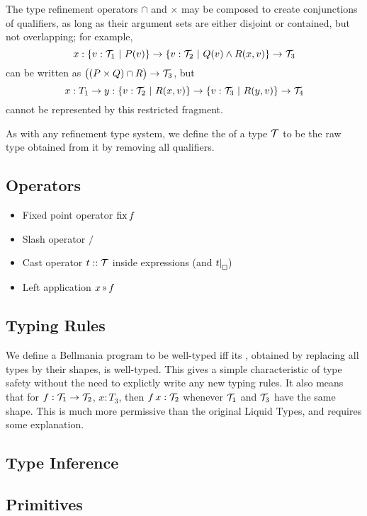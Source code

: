 The type refinement operators $\cap$ and $\times$ may be composed to create conjunctions of qualifiers,
as long as their argument sets are either disjoint or contained, but not overlapping;
for example, \[x:\{v:\mathcal{T}_1~|~P(v)\}\to \{v:\mathcal{T}_2~|~Q(v)\land R(x,v)\}\to\mathcal{T}_3\] can be written as
$\big((P\times Q)\cap R\big)\to\mathcal{T}_3$, but \[x:T_1\to y:\{v:\mathcal{T}_2~|~R(x,v)\} \to \{v:\mathcal{T}_3~|~R(y,v)\}\to\mathcal{T}_4\]
cannot be represented by this restricted fragment.

As with any refinement type system, we define the  of a type $\mathcal{T}$ to be the raw type
obtained from it by removing all qualifiers.

\subsection{Operators}

\newcommand\applt{\textrm{{\scriptsize\,}\guillemotright{\scriptsize\,}}}

{\color{Gray}
\begin{itemize}
  \item Fixed point operator $\operatorname{fix} f$
  \item Slash operator $/$
  \item Cast operator $t :: \mathcal{T}$ inside expressions (and $t|_{\setlength{\fboxsep}{2pt}\fbox{}}$)
  \item Left application $x \applt f$
\end{itemize}
}

\subsection{Typing Rules}

We define a Bellmania program to be well-typed iff its , obtained by replacing all types by
their shapes, is well-typed. This gives a simple characteristic of type safety without the need to
explictly write any new typing rules. It also means that for $f:\mathcal{T}_1\to\mathcal{T}_2$, $x:T_3$, then $f\,x:\mathcal{T}_2$ whenever
$\mathcal{T}_1$ and $\mathcal{T}_3$ have the same shape. This is much more permissive than the original Liquid Types,
and requires some explanation.

\subsection{Type Inference}

\subsection{Primitives}

